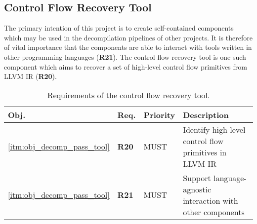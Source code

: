 
\subsection{Control Flow Recovery Tool}
\label{sec:req_control_flow_recovery_tool}

The primary intention of this project is to create self-contained components which may be used in the decompilation pipelines of other projects. It is therefore of vital importance that the components are able to interact with tools written in other programming languages (\textbf{R21}). The control flow recovery tool is one such component which aims to recover a set of high-level control flow primitives from LLVM IR (\textbf{R20}).

\begin{table}[htbp]
	\begin{center}
		\begin{tabular}{|l|l|l|l|}
			\hline
			Obj. & Req. & Priority & Description \\
			\hline
			\ref{itm:obj_decomp_pass_tool} & \textbf{R20} & MUST & Identify high-level control flow primitives in LLVM IR \\
			\ref{itm:obj_decomp_pass_tool} & \textbf{R21} & MUST & Support language-agnostic interaction with other components \\
			\hline
		\end{tabular}
	\end{center}
	\caption{Requirements of the control flow recovery tool.}
\end{table}
